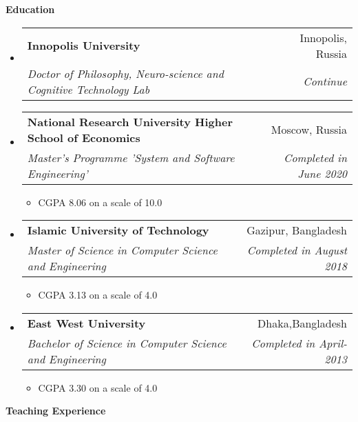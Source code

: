\documentclass[letterpaper,10pt]{article}
\makeatletter
\newcommand{\resheading}[1]{{\large \colorbox{mygrey}{\begin{minipage}{\textwidth}{\textbf{#1 \vphantom{p\^{E}}}}\end{minipage}}}}
\newcommand{\ressubheading}[4]{
\begin{tabular*}{6.5in}{l@{\extracolsep{\fill}}r}
		\textbf{#1} & #2 \\
		\textit{#3} & \textit{#4} \\
\end{tabular*}\vspace{-6pt}}
\makeatother
\begin{document}
\resheading{Education}
\begin{itemize}


\item
	\ressubheading{Innopolis University}{Innopolis, Russia}{Doctor of Philosophy, Neuro-science and Cognitive Technology Lab}{Continue}

\item
	\ressubheading{National Research University Higher School of Economics}{Moscow, Russia}{Master’s Programme 'System and Software Engineering'}{Completed in June 2020}
	\begin{itemize}

		\item  CGPA 8.06 on a scale of 10.0

	\end{itemize}


\item
	\ressubheading{Islamic University of Technology}{Gazipur, Bangladesh}{Master of Science in Computer Science and Engineering }{Completed in August 2018}
\begin{itemize}

		\item  CGPA 3.13  on a scale of 4.0

	\end{itemize}
	
\item
	\ressubheading{East West University}{Dhaka,Bangladesh}{Bachelor of Science in Computer Science and Engineering}{Completed in April-2013}
	\begin{itemize}
		\item  CGPA 3.30 on a scale of 4.0

	\end{itemize}


\end{itemize}




\resheading{Teaching Experience}
\end{document}
